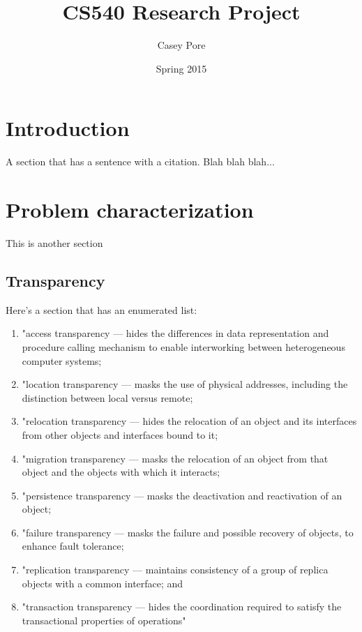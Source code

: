 \documentclass[letterpaper]{article}
\title{CS540 Research Project}
\author{Casey Pore}
\date{Spring 2015}
\begin{document}
\maketitle

\section{Introduction}

A section that has a sentence with a citation\cite{Dragland}. Blah blah blah...


\section{Problem characterization} %

This is another section

\subsection{Transparency}
Here's a section that has an enumerated list:

\begin{enumerate}
\item "access transparency — hides the differences in data representation and procedure calling
mechanism to enable interworking between heterogeneous computer systems;
\item "location transparency — masks the use of physical addresses, including the distinction
between local versus remote;
\item "relocation transparency — hides the relocation of an object and its interfaces from other
objects and interfaces bound to it;
\item "migration transparency — masks the relocation of an object from that object and the
objects with which it interacts;
\item "persistence transparency — masks the deactivation and reactivation of an object;
\item "failure transparency — masks the failure and possible recovery of objects, to enhance fault
tolerance;
\item "replication transparency — maintains consistency of a group of replica objects with a
common interface; and
\item "transaction transparency — hides the coordination required to satisfy the transactional
properties of operations"\cite{ISO92}
\end{enumerate}
\end{document}
